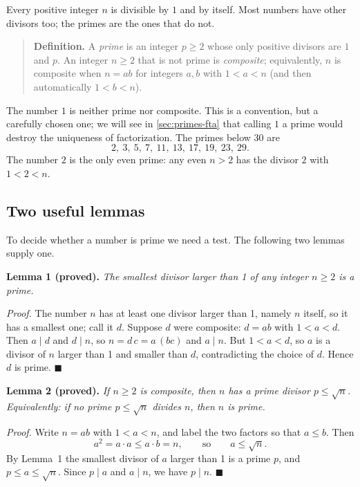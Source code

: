 Every positive integer $n$ is divisible by $1$ and by itself. Most numbers have other divisors too; the primes are the ones that do not.

\begin{quote}
\textbf{Definition.} A \emph{prime} is an integer $p\ge2$ whose only positive divisors are $1$ and $p$. An integer $n\ge2$ that is not prime is \emph{composite}; equivalently, $n$ is composite when $n=ab$ for integers $a,b$ with $1<a<n$ (and then automatically $1<b<n$).
\end{quote}

The number $1$ is neither prime nor composite. This is a convention, but a carefully chosen one; we will see in \cref{sec:primes-fta} that calling $1$ a prime would destroy the uniqueness of factorization. The primes below 30 are
\[
2,\ 3,\ 5,\ 7,\ 11,\ 13,\ 17,\ 19,\ 23,\ 29 .
\]
The number $2$ is the only even prime: any even $n>2$ has the divisor $2$ with $1<2<n$.

\subsection{Two useful lemmas}

To decide whether a number is prime we need a test. The following two lemmas supply one.

\textbf{Lemma 1 (proved).} \emph{The smallest divisor larger than 1 of any integer $n\ge2$ is a prime.}

\emph{Proof.} The number $n$ has at least one divisor larger than 1, namely $n$ itself, so it has a smallest one; call it $d$. Suppose $d$ were composite: $d=ab$ with $1<a<d$. Then $a\mid d$ and $d\mid n$, so $n=d\,c=a\,(bc)$ and $a\mid n$. But $1<a<d$, so $a$ is a divisor of $n$ larger than 1 and smaller than $d$, contradicting the choice of $d$. Hence $d$ is prime. $\blacksquare$

\textbf{Lemma 2 (proved).} \emph{If $n\ge2$ is composite, then $n$ has a prime divisor $p\le\sqrt n$. Equivalently: if no prime $p\le\sqrt n$ divides $n$, then $n$ is prime.}

\emph{Proof.} Write $n=ab$ with $1<a<n$, and label the two factors so that $a\le b$. Then
\begin{equation}
a^2 = a\cdot a \le a\cdot b = n,
\qquad\text{so}\qquad a\le\sqrt n .
\label{eq:primes-sqrt}
\end{equation}
By Lemma~1 the smallest divisor of $a$ larger than 1 is a prime $p$, and $p\le a\le\sqrt n$. Since $p\mid a$ and $a\mid n$, we have $p\mid n$. $\blacksquare$

